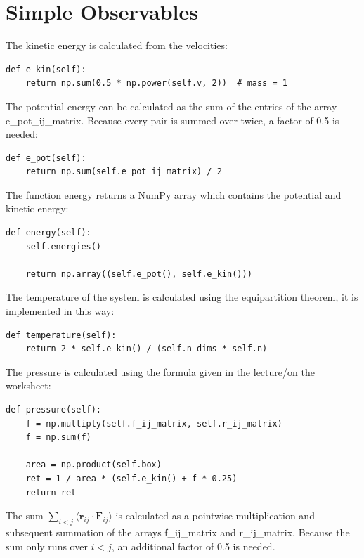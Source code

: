 \documentclass[a4paper,10pt,bibtotoc]{scrartcl}
\begin{document}
\newpage
\section{Simple Observables}
The kinetic energy is calculated from the velocities:
\begin{lstlisting}
def e_kin(self):
    return np.sum(0.5 * np.power(self.v, 2))  # mass = 1
\end{lstlisting}
The potential energy can be calculated as the sum of the entries of the array e\_pot\_ij\_matrix.
Because every pair is summed over twice, a factor of 0.5 is needed:
\begin{lstlisting}
def e_pot(self):
    return np.sum(self.e_pot_ij_matrix) / 2
\end{lstlisting}
The function energy returns a NumPy array which contains the potential and kinetic energy:
\begin{lstlisting}
def energy(self):
    self.energies()

    return np.array((self.e_pot(), self.e_kin()))
\end{lstlisting}
The temperature of the system is calculated using the equipartition theorem, it is implemented in this way:
\begin{lstlisting}
def temperature(self):
    return 2 * self.e_kin() / (self.n_dims * self.n)
\end{lstlisting}
The pressure is calculated using the formula given in the lecture/on the worksheet:
\begin{lstlisting}
def pressure(self):
    f = np.multiply(self.f_ij_matrix, self.r_ij_matrix)
    f = np.sum(f)

    area = np.product(self.box)
    ret = 1 / area * (self.e_kin() + f * 0.25)
    return ret
\end{lstlisting}
The sum $\sum_{i<j}\langle\mathbf{r}_{ij}\cdot\mathbf{F}_{ij}\rangle$ is calculated as a pointwise multiplication and subsequent summation of the arrays f\_ij\_matrix and r\_ij\_matrix. 
Because the sum only runs over $i<j$, an additional factor of 0.5 is needed.

\newpage
\end{document}
